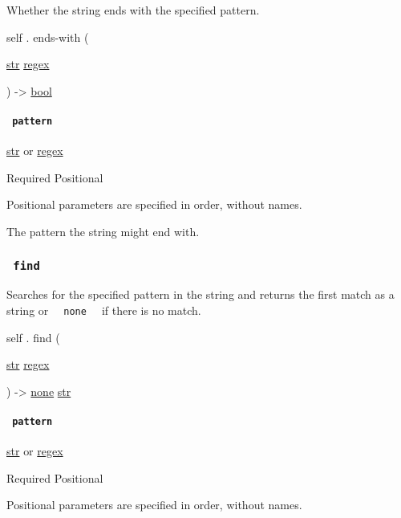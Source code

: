 Whether the string ends with the specified pattern.

self { . } { ends-with } (

{ \href{/docs/reference/foundations/str/}{str}
\href{/docs/reference/foundations/regex/}{regex} }

) -\textgreater{} \href{/docs/reference/foundations/bool/}{bool}

\paragraph{\texorpdfstring{\texttt{\ pattern\ }}{ pattern }}\label{definitions-ends-with-pattern}

\href{/docs/reference/foundations/str/}{str} {or}
\href{/docs/reference/foundations/regex/}{regex}

{Required} {{ Positional }}

\label{definitions-ends-with-pattern-positional-tooltip}
Positional parameters are specified in order, without names.

The pattern the string might end with.

\subsubsection{\texorpdfstring{\texttt{\ find\ }}{ find }}\label{definitions-find}

Searches for the specified pattern in the string and returns the first
match as a string or \texttt{\ }{\texttt{\ none\ }}\texttt{\ } if there
is no match.

self { . } { find } (

{ \href{/docs/reference/foundations/str/}{str}
\href{/docs/reference/foundations/regex/}{regex} }

) -\textgreater{} \href{/docs/reference/foundations/none/}{none}
\href{/docs/reference/foundations/str/}{str}

\paragraph{\texorpdfstring{\texttt{\ pattern\ }}{ pattern }}\label{definitions-find-pattern}

\href{/docs/reference/foundations/str/}{str} {or}
\href{/docs/reference/foundations/regex/}{regex}

{Required} {{ Positional }}

\label{definitions-find-pattern-positional-tooltip}
Positional parameters are specified in order, without names.

